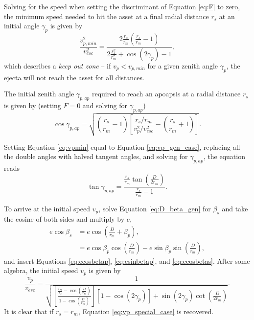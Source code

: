\documentclass{article}
\begin{document}
Solving for the speed when setting the discriminant of Equation \eqref{eq:F} to zero, the minimum speed needed to hit the asset at a final radial distance $r_s$ at an initial angle $\gamma_p$ is given by
\begin{equation}\label{eq:vpmin}
\frac{v_{p,min}^2}{v_{esc}^2} = \frac{2\frac{r_s}{r_m}\left(\frac{r_s}{r_m}-1\right)}{2\frac{r_s^2}{r_m^2}+\cos(2\gamma_p)-1},
\end{equation}
which describes a \textit{keep out zone} -- if $v_p < v_{p,min}$ for a given zenith angle $\gamma_p$, the ejecta will not reach the asset for all distances.

The initial zenith angle $\gamma_{p,ap}$ required to reach an apoapsis at a radial distance $r_s$ is given by (setting $F=0$ and solving for $\gamma_{p,ap}$)
\begin{equation}\label{eq:gamma p ap 1}
\cos\gamma_{p,ap} = \sqrt{\left(\frac{r_s}{r_m}-1\right)\left[\frac{r_s/r_m}{v_p^2/v_{esc}^2}-\left(\frac{r_s}{r_m}+1\right)\right]}.
\end{equation}

Setting Equation \eqref{eq:vpmin} equal to Equation \eqref{eq:vp_gen_case}, replacing all the double angles with halved tangent angles, and solving for $\gamma_{p,ap}$, the equation reads
\begin{equation}
\tan\gamma_{p,ap} = \frac{\frac{r_s}{r_m}\tan\left(\frac{D}{2r_m}\right)}{\frac{r_s}{r_m}-1}.
\end{equation}

To arrive at the initial speed $v_p$, solve Equation \eqref{eq:D_beta_gen} for $\beta_s$ and take the cosine of both sides and multiply by $e$,
\begin{align}\label{eq:speed der ecosbs}
e\cos\beta_s &= e\cos\left(\frac{D}{r_m}+\beta_p\right),\\
&= e\cos\beta_p\cos\left(\frac{D}{r_m}\right) - e\sin\beta_p\sin\left(\frac{D}{r_m}\right),\nonumber
\end{align}
and insert Equations \eqref{eq:ecosbetap}, \eqref{eq:esinbetap}, and \eqref{eq:ecosbetas}. After some algebra, the initial speed $v_p$ is given by
\begin{equation}\label{eq:vp_gen_case}
\frac{v_p}{v_{esc}} = \frac{1}{\sqrt{\left[\frac{\frac{r_m}{r_s}-\cos\left(\frac{D}{r_m}\right)}{1-\cos\left(\frac{D}{r_m}\right)}\right]\left[1-\cos(2\gamma_p)\right] + \sin(2\gamma_p)\cot\left(\frac{D}{2r_m}\right)}}.
\end{equation}
It is clear that if $r_s=r_m$, Equation \eqref{eq:vp_special_case} is recovered.
\end{document}
